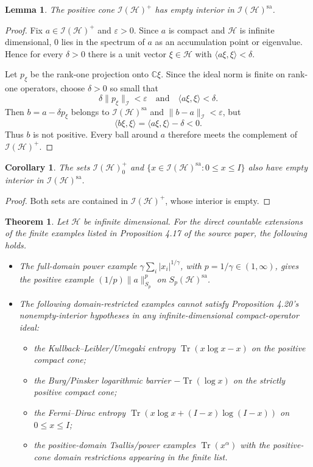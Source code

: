 \documentclass[11pt]{article}
\newtheorem{lemma}{Lemma}
\newtheorem{theorem}{Theorem}
\newtheorem{corollary}{Corollary}
\newcommand{\HH}{\mathcal H}
\newcommand{\I}{\mathcal I}
\newcommand{\sa}{\mathrm{sa}}
\newcommand{\Tr}{\operatorname{Tr}}
\begin{document}
\begin{lemma}
The positive cone $\I(\HH)^+$ has empty interior in $\I(\HH)^\sa$.
\end{lemma}

\begin{proof}
Fix $a\in\I(\HH)^+$ and $\varepsilon>0$. Since $a$ is compact and
$\HH$ is infinite dimensional, $0$ lies in the spectrum of $a$ as an
accumulation point or eigenvalue. Hence for every $\delta>0$ there is a
unit vector $\xi\in\HH$ with $\langle a\xi,\xi\rangle<\delta$.

Let $p_\xi$ be the rank-one projection onto $\mathbb C\xi$. Since the
ideal norm is finite on rank-one operators, choose $\delta>0$ so small
that
\[
  \delta\|p_\xi\|_{\I}<\varepsilon
  \quad\text{and}\quad
  \langle a\xi,\xi\rangle<\delta .
\]
Then $b=a-\delta p_\xi$ belongs to $\I(\HH)^\sa$ and
$\|b-a\|_\I<\varepsilon$, but
\[
  \langle b\xi,\xi\rangle
  =\langle a\xi,\xi\rangle-\delta<0.
\]
Thus $b$ is not positive. Every ball around $a$ therefore meets the
complement of $\I(\HH)^+$.
\end{proof}

\begin{corollary}
The sets $\I(\HH)^+_0$ and
$\{x\in\I(\HH)^\sa:0\le x\le I\}$ also have empty interior in
$\I(\HH)^\sa$.
\end{corollary}

\begin{proof}
Both sets are contained in $\I(\HH)^+$, whose interior is empty.
\end{proof}

\begin{theorem}
Let $\HH$ be infinite dimensional. For the direct countable extensions of
the finite examples listed in Proposition 4.17 of the source paper, the
following holds.
\begin{itemize}
\item The full-domain power example
  $\gamma\sum_i |x_i|^{1/\gamma}$, with $p=1/\gamma\in(1,\infty)$,
  gives the positive example $(1/p)\|a\|_{S_p}^p$ on $S_p(\HH)^\sa$.
\item The following domain-restricted examples cannot satisfy
  Proposition 4.20's nonempty-interior hypotheses in any
  infinite-dimensional compact-operator ideal:
\begin{itemize}
\item the Kullback--Leibler/Umegaki entropy
  $\Tr(x\log x-x)$ on the positive compact cone;
\item the Burg/Pinsker logarithmic barrier $-\Tr(\log x)$ on the
  strictly positive compact cone;
\item the Fermi--Dirac entropy
  $\Tr(x\log x+(I-x)\log(I-x))$ on $0\le x\le I$;
\item the positive-domain Tsallis/power examples $\Tr(x^\alpha)$ with
  the positive-cone domain restrictions appearing in the finite list.
\end{itemize}
\end{itemize}
\end{theorem}
\end{document}
